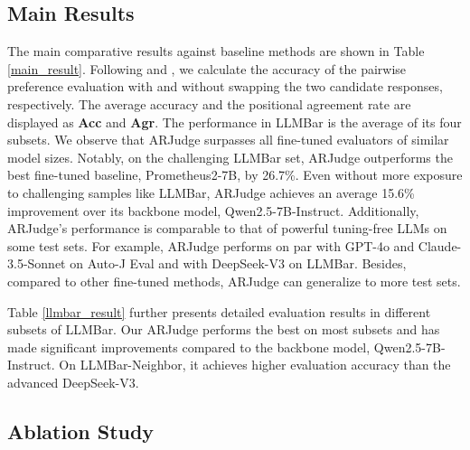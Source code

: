 \subsection{Main Results}

The main comparative results against baseline methods are shown in Table \ref{main_result}. Following \citet{llmbar} and \citet{auto-j}, we calculate the accuracy of the pairwise preference evaluation with and without swapping the two candidate responses, respectively. The average accuracy and the positional agreement rate are displayed as \textbf{Acc} and \textbf{Agr}. The performance in LLMBar is the average of its four subsets. We observe that ARJudge surpasses all fine-tuned evaluators of similar model sizes. Notably, on the challenging LLMBar set, ARJudge outperforms the best fine-tuned baseline, Prometheus2-7B, by 26.7\%. Even without more exposure to challenging samples like LLMBar, ARJudge achieves an average 15.6\% improvement over its backbone model, Qwen2.5-7B-Instruct. Additionally, ARJudge's performance is comparable to that of powerful tuning-free LLMs on some test sets. For example, ARJudge performs on par with GPT-4o and Claude-3.5-Sonnet on Auto-J Eval and with DeepSeek-V3 on LLMBar. Besides, compared to other fine-tuned methods, ARJudge can generalize to more test sets.

Table \ref{llmbar_result} further presents detailed evaluation results in different subsets of LLMBar. Our ARJudge performs the best on most subsets and has made significant improvements compared to the backbone model, Qwen2.5-7B-Instruct. On LLMBar-Neighbor, it achieves higher evaluation accuracy than the advanced DeepSeek-V3. 

\subsection{Ablation Study}
\begin{table}[t!]
\center
{}
\caption{Comparison results under ablation settings. ``JudgeLM'', ``PandaLM'', and ``Auto-J'' are abbreviation of the associated testsets. ``\textbf{FT}'' and ``\textbf{MF}'' represent fine-tuning and multi-faceted.}
\label{ablation}
\end{table}

